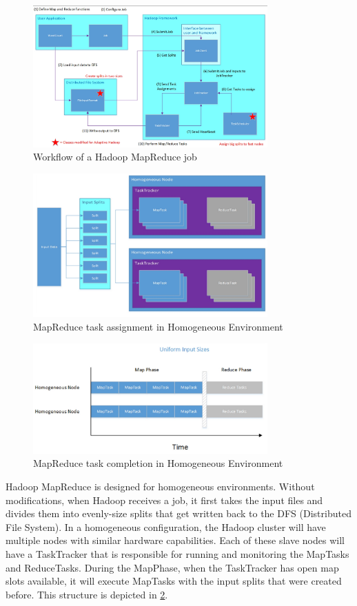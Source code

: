 \begin{figure}[ht!]
\centering
\includegraphics[width=90mm]{flow.jpg}
\caption{Workflow of a Hadoop MapReduce job}
\label{fig:flow}
\end{figure}

\begin{figure}[ht!]
\centering
\includegraphics[width=90mm]{homogeneous_mr.jpg}
\caption{MapReduce task assignment in Homogeneous Environment}
\label{fig:homogeneous_mr}
\end{figure}

\begin{figure}[ht!]
\centering
\includegraphics[width=90mm]{homogeneous_time.jpg}
\caption{MapReduce task completion in Homogeneous Environment}
\label{fig:homogeneous_time}
\end{figure}

Hadoop MapReduce is designed for homogeneous environments. Without modifications, when Hadoop receives a job,
it first takes the input files and divides them into evenly-size splits that
get written back to the DFS (Distributed File System). In a homogeneous configuration, the Hadoop cluster
will have multiple nodes with similar hardware capabilities. Each of these slave nodes will have a
TaskTracker that is responsible for running and monitoring the MapTasks and ReduceTasks. During the MapPhase,
when the TaskTracker has open map slots available, it will execute MapTasks with the input splits that were
created before. This structure is depicted in \ref{fig:homogeneous_mr}.


